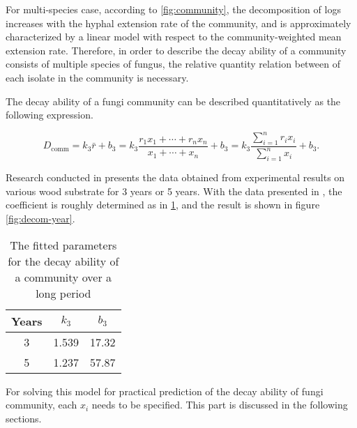 For multi-species case, according to \ref{fig:community}, the decomposition of logs increases with the hyphal extension rate of the community, and is approximately characterized by a linear model with respect to the community-weighted mean extension rate. Therefore, in order to describe the decay ability of a community consists of multiple species of fungus, the relative quantity relation between of each isolate in the community is necessary.

The decay ability of a fungi community can be described quantitatively as the following expression.

\begin{equation}\label{eq:dcomm}
    D_\text{comm} =
    k_3\bar{r} + b_3=
    k_3\frac{r_1x_1 + \cdots + r_nx_n}{x_1 + \cdots + x_n} + b_3 =
    k_3\dfrac{\sum_{i=1}^n r_ix_i}{\sum_{i=1}^n x_i} + b_3.
\end{equation}

Research conducted in \cite{Lustenshouwer} presents the data obtained from experimental results on various wood substrate for 3 years or 5 years. With the data presented in \cite{Maynard-data}, the coefficient is roughly determined as in \ref{tb:para-year}, and the result is shown in figure \ref{fig:decom-year}.

\begin{table}
    \begin{minipage}{0.6\textwidth}
        \caption{The fitted parameters for the decay ability of a community over a long period}
        \label{tb:para-year}
    \end{minipage}
    \begin{minipage}{0.4\textwidth}\centering
        \centering
        \begin{tabular}{c|cc}
            \toprule
            Years & $k_3$ & $b_3$ \\
            \midrule
            3     & 1.539 & 17.32 \\
            5     & 1.237 & 57.87 \\
            \bottomrule
        \end{tabular}
    \end{minipage}
\end{table}

For solving this model for practical prediction of the decay ability of fungi community, each $x_i$ needs to be specified. This part is discussed in the following sections.
